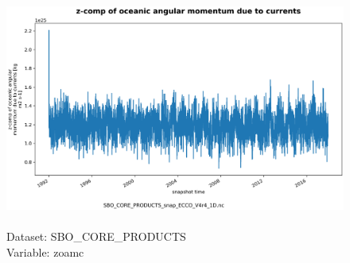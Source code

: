 \begin{figure}[H]
\centering
\includegraphics[scale=0.5]{../images/plots/oneD_plots/SBO_Core_Products/zoamc.png}
\caption{\\Dataset: SBO\_CORE\_PRODUCTS\\Variable: zoamc}
\label{tab:table-SBO_CORE_PRODUCTS_zoamc-Plot}
\end{figure}
\pagebreak
